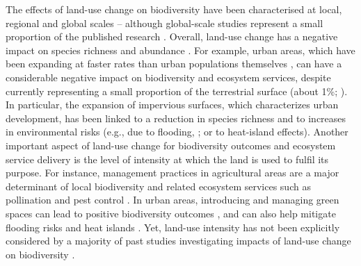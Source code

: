 The effects of land-use change on biodiversity have been characterised at local, regional and global scales – although global-scale studies represent a small proportion of the published research \citep{Davison2021}. Overall, land-use change  has a negative impact on species richness and abundance \citep{Newbold2015, Foley2005}. For example, urban areas, which have been expanding at faster rates than urban populations themselves \citep{Seto2010}, can have a considerable negative impact on biodiversity and ecosystem services, despite currently representing a small proportion of the terrestrial surface (about 1\%; \citet{Goldewijk2017}). In particular, the expansion of impervious surfaces, which characterizes urban development, has been linked to a reduction in species richness \citep{Souza2019, Yan2019} and to increases in environmental risks (e.g., due to flooding, \citet{Hou2022}; or to heat-island effects). Another important aspect of land-use change for biodiversity outcomes and ecosystem service delivery is the level of intensity at which the land is used to fulfil its purpose. For instance, management practices in agricultural areas are a major determinant of local biodiversity and related ecosystem services such as pollination and pest control \citep{Foley2005, Kehoe2015a, Millard2021}. In urban areas, introducing and managing green spaces can lead to positive biodiversity outcomes \citep{Ives2016, Aronson2017}, and can also help mitigate flooding risks and heat islands \citep{Livesley2016}. Yet, land-use intensity has not been explicitly considered by a majority of past studies investigating impacts of land-use change on biodiversity \citep{Davison2021, Dullinger2021}.

